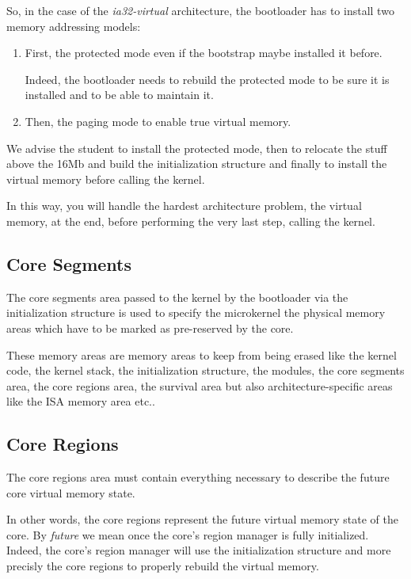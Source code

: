So, in the case of the \textit{ia32-virtual} architecture, the bootloader
has to install two memory addressing models:

\begin{enumerate}
  \item
    First, the protected mode even if the bootstrap maybe installed it
    before.

    Indeed, the bootloader needs to rebuild the protected mode to be sure
    it is installed and to be able to maintain it.
  \item
    Then, the paging mode to enable true virtual memory.
\end{enumerate}

We advise the student to install the protected mode, then to relocate the
stuff above the 16Mb and build the initialization structure and finally to install the
virtual memory before calling the kernel.

In this way, you will handle the hardest architecture problem, the virtual
memory, at the end, before performing the very last step, calling the kernel.

%
%

\subsection{Core Segments}

The core segments area passed to the kernel by the bootloader via
the initialization structure is used to specify the microkernel the
physical memory areas which have to be marked as pre-reserved by the core.

These memory areas are memory areas to keep from being erased like the
kernel code, the kernel stack, the initialization structure, the modules,
the core segments area, the core regions area, the survival area but also
architecture-specific areas like the ISA memory area etc..

%
%

\subsection{Core Regions}

The core regions area must contain everything necessary to describe
the future core virtual memory state.

In other words, the core regions represent the future virtual memory
state of the core. By \textit{future} we mean once the core's region
manager is fully initialized. Indeed, the core's region manager will
use the initialization structure and more precisly the core regions to
properly rebuild the virtual memory.

